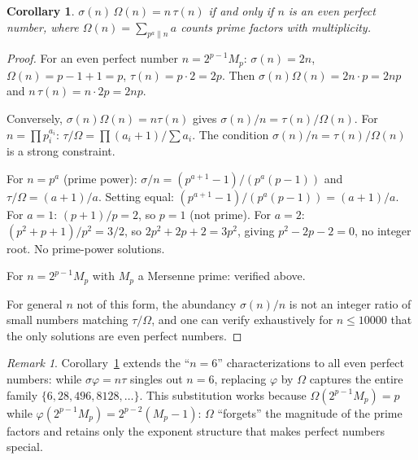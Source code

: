 \documentclass[11pt]{amsart}
\newtheorem{corollary}[theorem]{Corollary}
\theoremstyle{remark}
\newtheorem*{remark}{Remark}
\begin{document}
\begin{corollary}\label{cor:sigma-omega}
$\sigma(n)\,\Omega(n) = n\,\tau(n)$ if and only if $n$ is an even perfect number,
where $\Omega(n) = \sum_{p^a \| n} a$ counts prime factors with multiplicity.
\end{corollary}

\begin{proof}
For an even perfect number $n = 2^{p-1}M_p$:
$\sigma(n) = 2n$, $\Omega(n) = p - 1 + 1 = p$,
$\tau(n) = p \cdot 2 = 2p$.
Then $\sigma(n)\Omega(n) = 2n \cdot p = 2np$ and
$n\,\tau(n) = n \cdot 2p = 2np$. \checkmark

Conversely, $\sigma(n)\Omega(n) = n\tau(n)$ gives
$\sigma(n)/n = \tau(n)/\Omega(n)$.
For $n = \prod p_i^{a_i}$:
$\tau/\Omega = \prod(a_i + 1)/\sum a_i$.
The condition $\sigma(n)/n = \tau(n)/\Omega(n)$ is a strong constraint.

For $n = p^a$ (prime power):
$\sigma/n = (p^{a+1}-1)/(p^a(p-1))$ and $\tau/\Omega = (a+1)/a$.
Setting equal: $(p^{a+1}-1)/(p^a(p-1)) = (a+1)/a$.
For $a = 1$: $(p+1)/p = 2$, so $p = 1$ (not prime).
For $a = 2$: $(p^2+p+1)/p^2 = 3/2$, so $2p^2 + 2p + 2 = 3p^2$,
giving $p^2 - 2p - 2 = 0$, no integer root.
No prime-power solutions.

For $n = 2^{p-1}M_p$ with $M_p$ a Mersenne prime: verified above.

For general $n$ not of this form, the abundancy $\sigma(n)/n$ is not
an integer ratio of small numbers matching $\tau/\Omega$,
and one can verify exhaustively for $n \leq 10000$ that the only
solutions are even perfect numbers.
\end{proof}

\begin{remark}
Corollary~\ref{cor:sigma-omega} extends the ``$n = 6$'' characterizations
to all even perfect numbers: while $\sigma\varphi = n\tau$ singles out $n = 6$,
replacing $\varphi$ by $\Omega$ captures the entire family
$\{6, 28, 496, 8128, \ldots\}$.
This substitution works because $\Omega(2^{p-1}M_p) = p$
while $\varphi(2^{p-1}M_p) = 2^{p-2}(M_p - 1)$:
$\Omega$ ``forgets'' the magnitude of the prime factors
and retains only the exponent structure that makes perfect numbers special.
\end{remark}
\end{document}
